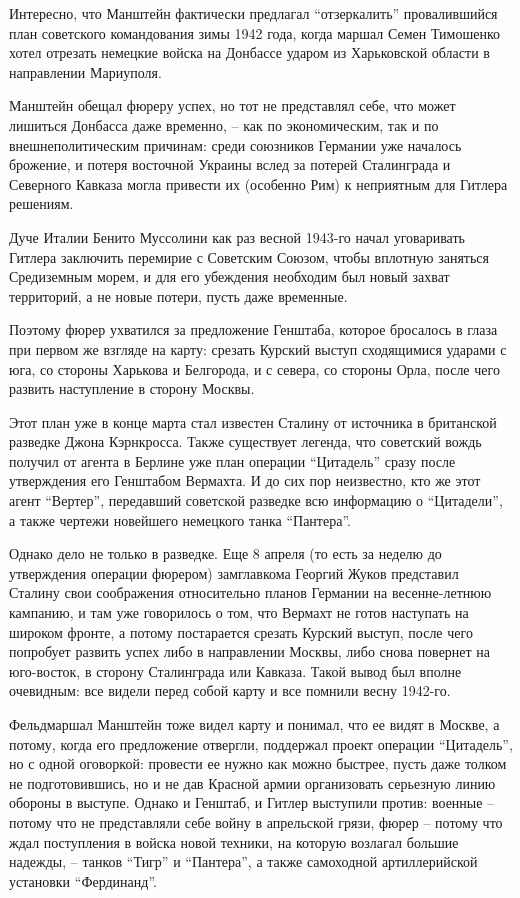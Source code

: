 Интересно, что Манштейн фактически предлагал \enquote{отзеркалить} провалившийся план
советского командования зимы 1942 года, когда маршал Семен Тимошенко хотел
отрезать немецкие войска на Донбассе ударом из Харьковской области в
направлении Мариуполя.

Манштейн обещал фюреру успех, но тот не представлял себе, что может лишиться
Донбасса даже временно, – как по экономическим, так и по внешнеполитическим
причинам: среди союзников Германии уже началось брожение, и потеря восточной
Украины вслед за потерей Сталинграда и Северного Кавказа могла привести их
(особенно Рим) к неприятным для Гитлера решениям.

Дуче Италии Бенито Муссолини как раз весной 1943-го начал уговаривать Гитлера
заключить перемирие с Советским Союзом, чтобы вплотную заняться Средиземным
морем, и для его убеждения необходим был новый захват территорий, а не новые
потери, пусть даже временные.

Поэтому фюрер ухватился за предложение Генштаба, которое бросалось в глаза при
первом же взгляде на карту: срезать Курский выступ сходящимися ударами с юга,
со стороны Харькова и Белгорода, и с севера, со стороны Орла, после чего
развить наступление в сторону Москвы.


Этот план уже в конце марта стал известен Сталину от источника в британской
разведке Джона Кэрнкросса. Также существует легенда, что советский вождь
получил от агента в Берлине уже план операции \enquote{Цитадель} сразу после
утверждения его Генштабом Вермахта. И до сих пор неизвестно, кто же этот агент
\enquote{Вертер}, передавший советской разведке всю информацию о \enquote{Цитадели}, а также
чертежи новейшего немецкого танка \enquote{Пантера}.

Однако дело не только в разведке. Еще 8 апреля (то есть за неделю до
утверждения операции фюрером) замглавкома Георгий Жуков представил Сталину свои
соображения относительно планов Германии на весенне-летнюю кампанию, и там уже
говорилось о том, что Вермахт не готов наступать на широком фронте, а потому
постарается срезать Курский выступ, после чего попробует развить успех либо в
направлении Москвы, либо снова повернет на юго-восток, в сторону Сталинграда
или Кавказа. Такой вывод был вполне очевидным: все видели перед собой карту и
все помнили весну 1942-го.

Фельдмаршал Манштейн тоже видел карту и понимал, что ее видят в Москве, а
потому, когда его предложение отвергли, поддержал проект операции \enquote{Цитадель},
но с одной оговоркой: провести ее нужно как можно быстрее, пусть даже толком не
подготовившись, но и не дав Красной армии организовать серьезную линию обороны
в выступе. Однако и Генштаб, и Гитлер выступили против: военные – потому что не
представляли себе войну в апрельской грязи, фюрер – потому что ждал поступления
в войска новой техники, на которую возлагал большие надежды, – танков \enquote{Тигр} и
\enquote{Пантера}, а также самоходной артиллерийской установки \enquote{Фердинанд}.


